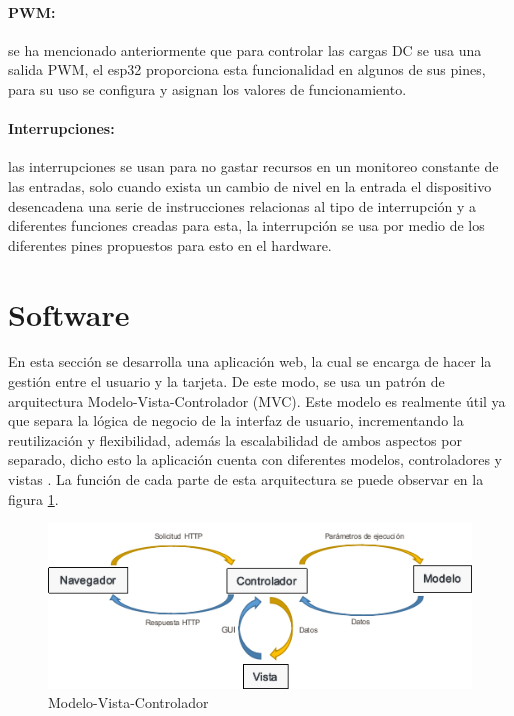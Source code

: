 \paragraph{PWM:}

se ha mencionado anteriormente que para controlar las cargas DC se usa una salida PWM, el esp32 proporciona esta funcionalidad en algunos de sus pines, para su uso se configura y asignan los valores de funcionamiento.

\paragraph{Interrupciones:}

las interrupciones se usan para no gastar recursos en un monitoreo constante de las entradas, solo cuando exista un cambio de nivel en la entrada el dispositivo desencadena una serie de instrucciones relacionas al tipo de interrupción y a diferentes funciones creadas para esta, la interrupción se usa por medio de los diferentes pines propuestos para esto en el hardware.

\section{Software}

En esta sección se desarrolla una aplicación web, la cual se encarga de hacer la gestión entre el usuario y la tarjeta. De este modo, se usa un patrón de arquitectura Modelo-Vista-Controlador (MVC). Este modelo es realmente útil ya que separa la lógica de negocio de la interfaz de usuario, incrementando la reutilización y flexibilidad, además la escalabilidad de ambos aspectos por separado, dicho esto la aplicación cuenta con diferentes modelos, controladores y vistas \cite{MVC1}. La función de cada parte de esta arquitectura se puede observar en la figura \ref{fig:mvc}.\\

\begin{figure}[H]
	\centering
	\caption{Modelo-Vista-Controlador}
	\label{fig:mvc}
	\includegraphics[width=0.7\linewidth]{Imagenes/MVC}
\end{figure}


